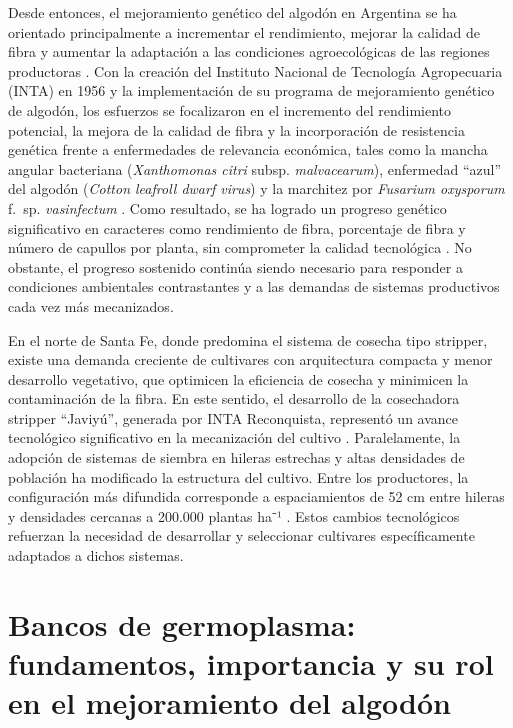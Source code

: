 \documentclass[12pt,oneside]{reedthesis}
\begin{document}
Desde entonces, el mejoramiento genético del algodón en Argentina se ha orientado principalmente a incrementar el rendimiento, mejorar la calidad de fibra y aumentar la adaptación a las condiciones agroecológicas de las regiones productoras \autocite{paytas2013,paytas2023}. Con la creación del Instituto Nacional de Tecnología Agropecuaria (INTA) en 1956 y la implementación de su programa de mejoramiento genético de algodón, los esfuerzos se focalizaron en el incremento del rendimiento potencial, la mejora de la calidad de fibra y la incorporación de resistencia genética frente a enfermedades de relevancia económica, tales como la mancha angular bacteriana (\emph{Xanthomonas citri} subsp. \emph{malvacearum}), enfermedad ``azul'' del algodón (\emph{Cotton leafroll dwarf virus}) y la marchitez por \emph{Fusarium oxysporum} f.~sp. \emph{vasinfectum} \autocite{royo2007,scarpin2022,scarpin2023}. Como resultado, se ha logrado un progreso genético significativo en caracteres como rendimiento de fibra, porcentaje de fibra y número de capullos por planta, sin comprometer la calidad tecnológica \autocite{scarpin2022,scarpin2023}. No obstante, el progreso sostenido continúa siendo necesario para responder a condiciones ambientales contrastantes y a las demandas de sistemas productivos cada vez más mecanizados.

En el norte de Santa Fe, donde predomina el sistema de cosecha tipo stripper, existe una demanda creciente de cultivares con arquitectura compacta y menor desarrollo vegetativo, que optimicen la eficiencia de cosecha y minimicen la contaminación de la fibra. En este sentido, el desarrollo de la cosechadora stripper ``Javiyú'', generada por INTA Reconquista, representó un avance tecnológico significativo en la mecanización del cultivo \autocite{pilatti2007,pilatti2021}. Paralelamente, la adopción de sistemas de siembra en hileras estrechas y altas densidades de población ha modificado la estructura del cultivo. Entre los productores, la configuración más difundida corresponde a espaciamientos de 52 cm entre hileras y densidades cercanas a 200.000 plantas ha⁻¹ \autocite{paytas2011}. Estos cambios tecnológicos refuerzan la necesidad de desarrollar y seleccionar cultivares específicamente adaptados a dichos sistemas.

\section{Bancos de germoplasma: fundamentos, importancia y su rol en el mejoramiento del algodón}\label{bancos-de-germoplasma-fundamentos-importancia-y-su-rol-en-el-mejoramiento-del-algoduxf3n}
\end{document}
